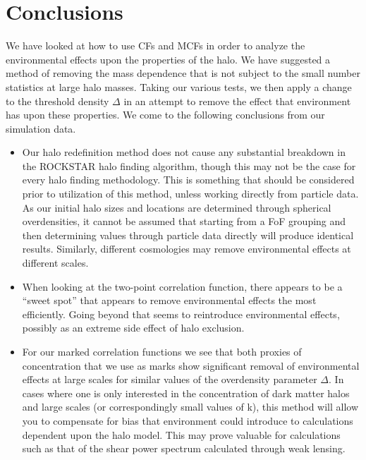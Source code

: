 \documentclass[usenatbib,usegraphicx,letterpaper]{mn2e}
\begin{document}
\section[]{Conclusions}
\label{section:conclusions}

We have looked at how to use CFs and MCFs in order to analyze the environmental effects upon the properties of the halo. We have suggested a method of removing the mass dependence that is not subject to the small number statistics at large halo masses. Taking our various tests, we then apply a change to the threshold density $\Delta$ in an attempt to remove the effect that environment has upon these properties. We come to the following conclusions from our simulation data.

\begin{itemize}
	\item Our halo redefinition method does not cause any substantial breakdown in the ROCKSTAR halo finding algorithm, though this may not be the case for every halo finding methodology. This is something that should be considered prior to utilization of this method, unless working directly from particle data. As our initial halo sizes and locations are determined through spherical overdensities, it cannot be assumed that starting from a FoF grouping and then determining values through particle data directly will produce identical results. Similarly, different cosmologies may remove environmental effects at different scales.

	\item When looking at the two-point correlation function, there appears to be a ``sweet spot'' that appears to remove environmental effects the most efficiently. Going beyond that seems to reintroduce environmental effects, possibly as an extreme side effect of halo exclusion.

	\item For our marked correlation functions we see that both proxies of concentration that we use as marks show significant removal of environmental effects at large scales for similar values of the overdensity parameter $\Delta$. In cases where one is only interested in the concentration of dark matter halos and large scales (or correspondingly small values of k), this method will allow you to compensate for bias that environment could introduce to calculations dependent upon the halo model. This may prove valuable for calculations such as that of the shear power spectrum calculated through weak lensing.


\end{itemize}
\end{document}
